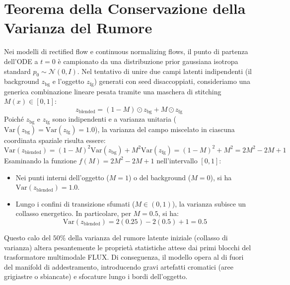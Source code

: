 \documentclass[12pt,a4paper]{report}
\begin{document}
\section{Teorema della Conservazione della Varianza del Rumore}
Nei modelli di rectified flow e continuous normalizing flows, il punto di partenza dell'ODE a $t=0$ è campionato da una distribuzione prior gaussiana isotropa standard $p_0 \sim \mathcal{N}(0, I)$.
Nel tentativo di unire due campi latenti indipendenti (il background $z_{\text{bg}}$ e l'oggetto $z_{\text{fg}}$) generati con seed disaccoppiati, consideriamo una generica combinazione lineare pesata tramite una maschera di stitching $M(x) \in [0, 1]$:
\begin{equation}
    z_{\text{blended}} = (1 - M) \odot z_{\text{bg}} + M \odot z_{\text{fg}}
\end{equation}
Poiché $z_{\text{bg}}$ e $z_{\text{fg}}$ sono indipendenti e a varianza unitaria ($\text{Var}(z_{\text{bg}}) = \text{Var}(z_{\text{fg}}) = 1.0$), la varianza del campo miscelato in ciascuna coordinata spaziale risulta essere:
\begin{equation}
    \text{Var}(z_{\text{blended}}) = (1 - M)^2 \text{Var}(z_{\text{bg}}) + M^2 \text{Var}(z_{\text{fg}}) = (1 - M)^2 + M^2 = 2M^2 - 2M + 1
\end{equation}
Esaminando la funzione $f(M) = 2M^2 - 2M + 1$ nell'intervallo $[0, 1]$:
\begin{itemize}
    \item Nei punti interni dell'oggetto ($M=1$) o del background ($M=0$), si ha $\text{Var}(z_{\text{blended}}) = 1.0$.
    \item Lungo i confini di transizione sfumati ($M \in (0, 1)$), la varianza subisce un collasso energetico. In particolare, per $M=0.5$, si ha:
    \begin{equation}
        \text{Var}(z_{\text{blended}}) = 2(0.25) - 2(0.5) + 1 = 0.5
    \end{equation}
\end{itemize}
Questo calo del $50\%$ della varianza del rumore latente iniziale (collasso di varianza) altera pesantemente le proprietà statistiche attese dai primi blocchi del trasformatore multimodale FLUX. Di conseguenza, il modello opera al di fuori del manifold di addestramento, introducendo gravi artefatti cromatici (aree grigiastre o sbiancate) e sfocature lungo i bordi dell'oggetto.
\end{document}
